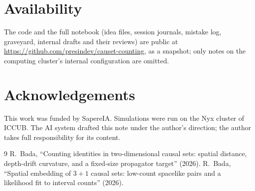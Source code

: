 \documentclass[11pt,a4paper]{article}
\begin{document}
\section*{Availability}
The code and the full notebook (idea files, session journals, mistake log, graveyard, internal drafts and their reviews) are public at \url{https://github.com/presindev/causet-counting}, as a snapshot; only notes on the computing cluster's internal configuration are omitted.

\section*{Acknowledgements}
This work was funded by SapereIA. Simulations were run on the Nyx cluster of ICCUB. The AI system drafted this note under the author's direction; the author takes full responsibility for its content.

\begin{thebibliography}{9}\small
{} R.~Bada, ``Counting identities in two-dimensional causal sets: spatial distance, depth-drift curvature, and a fixed-size propagator target'' (2026).
 R.~Bada, ``Spatial embedding of $3+1$ causal sets: low-count spacelike pairs and a likelihood fit to interval counts'' (2026).
\end{thebibliography}
\end{document}
